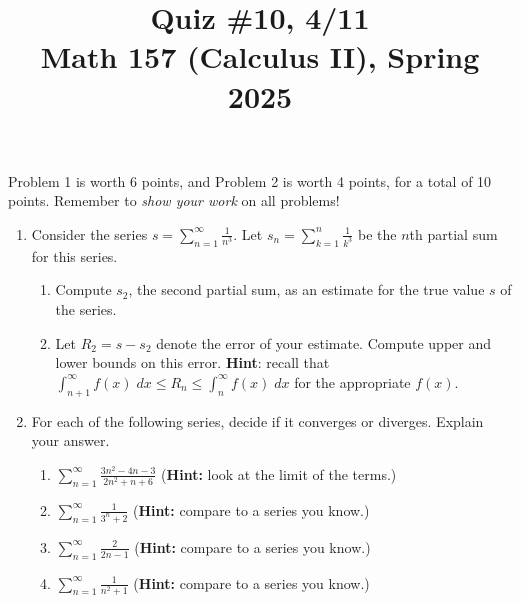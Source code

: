 \documentclass[11pt]{article}
\title{Quiz \#10, 4/11\\ Math 157 (Calculus II), Spring 2025}
\date{}
\begin{document}
\maketitle

\thispagestyle{empty}

\vspace{-2cm}

Problem 1 is worth 6 points, and Problem 2 is worth 4 points, for a total of 10 points. Remember to \emph{show your work} on all problems!

\begin{enumerate}

\item Consider the series $s = \displaystyle \sum_{n=1}^{\infty}\frac{1}{n^3}$. Let $s_n = \displaystyle \sum_{k=1}^{n} \frac{1}{k^3}$ be the $n$th partial sum for this series.

\begin{enumerate}
\item Compute $s_2$, the second partial sum, as an estimate for the true value $s$ of the series.
\item Let $R_2 = s - s_2$ denote the error of your estimate. Compute upper and lower bounds on this error. {\bf Hint}: recall that $\int_{n+1}^{\infty} f(x) \; dx \leq R_n \leq \int_{n}^{\infty} f(x) \; dx$ for the appropriate $f(x)$.
\end{enumerate}

\vspace{2.15in}

\item For each of the following series, decide if it converges or diverges. Explain your answer.

\begin{enumerate}
\item $\displaystyle \sum_{n=1}^{\infty} \frac{3n^2-4n-3}{2n^2+n+6}$ \hfill ({\bf Hint:} look at the limit of the terms.)
\item $\displaystyle \sum_{n=1}^{\infty} \frac{1}{3^n + 2}$ \hfill ({\bf Hint:} compare to a series you know.)
\item $\displaystyle \sum_{n=1}^{\infty} \frac{2}{2n-1}$ \hfill ({\bf Hint:} compare to a series you know.)
\item $\displaystyle \sum_{n=1}^{\infty} \frac{1}{n^2+1}$ \hfill ({\bf Hint:} compare to a series you know.)
\end{enumerate}

\end{enumerate}
\end{document}
